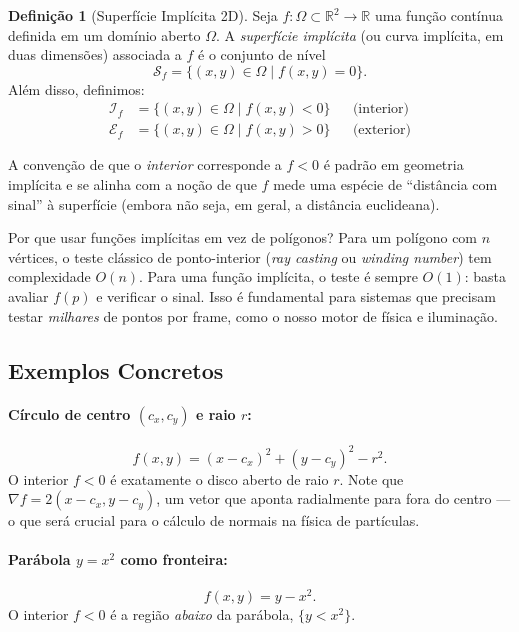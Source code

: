 \documentclass[11pt,a4paper]{article}
\theoremstyle{plain}
\theoremstyle{definition}
\newtheorem{definition}[theorem]{Definição}
\newcommand{\R}{\mathbb{R}}
\newcommand{\grad}{\nabla}
\begin{document}
\begin{definition}[Superfície Implícita 2D]
Seja $f : \Omega \subset \R^2 \to \R$ uma função contínua definida em um
domínio aberto $\Omega$. A \emph{superfície implícita} (ou curva implícita, em
duas dimensões) associada a $f$ é o conjunto de nível
\[
    \mathcal{S}_f = \{ (x, y) \in \Omega \mid f(x, y) = 0 \}.
\]
Além disso, definimos:
\begin{align*}
    \mathcal{I}_f &= \{ (x, y) \in \Omega \mid f(x, y) < 0 \} 
        && \text{(interior)} \\
    \mathcal{E}_f &= \{ (x, y) \in \Omega \mid f(x, y) > 0 \} 
        && \text{(exterior)}
\end{align*}
\end{definition}

A convenção de que o \emph{interior} corresponde a $f < 0$ é padrão em
geometria implícita e se alinha com a noção de que $f$ mede uma espécie de
``distância com sinal'' à superfície (embora não seja, em geral, a distância
euclideana).

\begin{tcolorbox}[motivacao]
Por que usar funções implícitas em vez de polígonos? Para um polígono com $n$
vértices, o teste clássico de ponto-interior (\textit{ray casting} ou
\textit{winding number}) tem complexidade $O(n)$. Para uma função implícita,
o teste é sempre $O(1)$: basta avaliar $f(p)$ e verificar o sinal. Isso é
fundamental para sistemas que precisam testar \emph{milhares} de pontos por
frame, como o nosso motor de física e iluminação.
\end{tcolorbox}

\subsection{Exemplos Concretos}

\paragraph{Círculo de centro $(c_x, c_y)$ e raio $r$:}
\[
    f(x, y) = (x - c_x)^2 + (y - c_y)^2 - r^2.
\]
O interior $f < 0$ é exatamente o disco aberto de raio $r$. Note que
$\grad f = 2(x - c_x, y - c_y)$, um vetor que aponta radialmente para fora do
centro --- o que será crucial para o cálculo de normais na física de partículas.

\paragraph{Parábola $y = x^2$ como fronteira:}
\[
    f(x, y) = y - x^2.
\]
O interior $f < 0$ é a região \emph{abaixo} da parábola, $\{y < x^2\}$.
\end{document}
